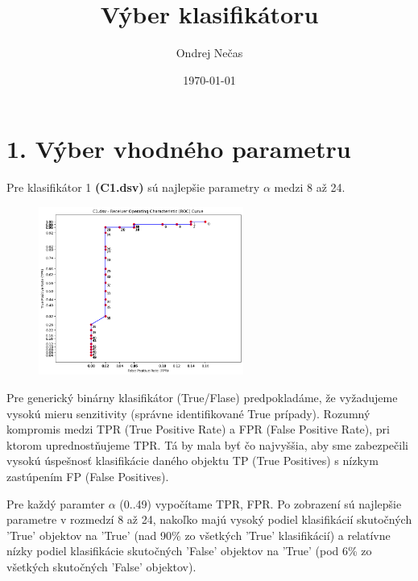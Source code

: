 \documentclass[a4paper, 11pt]{report}
\institute{Kybernetika a umělá inteligence}
\title{Výber klasifikátoru}
\author{Ondrej Nečas}
\date{\today}
\begin{document}
    \maketitle
    \newpage

    \section*{1. Výber vhodného parametru}\label{sec:parameter-selection}

    Pre klasifikátor 1 \textbf{(C1.dsv)} sú najlepšie parametry $\alpha$ medzi 8 až 24.

    \begin{figure} %
        \centering
        \includegraphics[width=0.6\textwidth]{images/first} %
        \label{fig:c1-roc}
    \end{figure}

    Pre generický binárny klasifikátor (True/Flase) predpokladáme, že vyžadujeme vysokú mieru senzitivity (správne identifikované
    True prípady). Rozumný kompromis medzi TPR (True Positive Rate) a FPR (False Positive Rate), pri ktorom uprednostňujeme TPR. Tá by mala byť
    čo najvyššia, aby sme zabezpečili vysokú úspešnosť klasifikácie daného objektu TP (True Positives) s nízkym zastúpením FP (False Positives).

    Pre každý paramter $\alpha$ (0..49) vypočítame TPR, FPR. Po zobrazení sú najlepšie parametre v rozmedzí 8 až 24, nakoľko majú
    vysoký podiel klasifikácií skutočných 'True' objektov na 'True' (nad 90\% zo všetkých 'True' klasifikácií) a relatívne
    nízky podiel klasifikácie skutočných 'False' objektov na 'True' (pod 6\% zo všetkých skutočných 'False' objektov).
\end{document}
